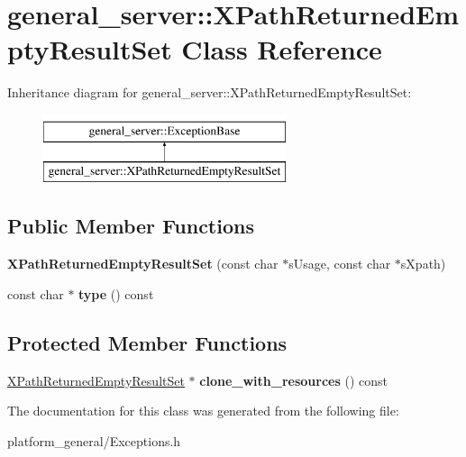 \hypertarget{classgeneral__server_1_1XPathReturnedEmptyResultSet}{\section{general\-\_\-server\-:\-:\-X\-Path\-Returned\-Empty\-Result\-Set \-Class \-Reference}
\label{classgeneral__server_1_1XPathReturnedEmptyResultSet}
}
\-Inheritance diagram for general\-\_\-server\-:\-:\-X\-Path\-Returned\-Empty\-Result\-Set\-:\begin{figure}[H]
\begin{center}
\leavevmode
\includegraphics[height=2.000000cm]{classgeneral__server_1_1XPathReturnedEmptyResultSet}
\end{center}
\end{figure}
\subsection*{\-Public \-Member \-Functions}
\begin{DoxyCompactItemize}
\item 
\hypertarget{classgeneral__server_1_1XPathReturnedEmptyResultSet_a0fec6a2e29fcc8a206277a105ef3dcba}{{\bfseries \-X\-Path\-Returned\-Empty\-Result\-Set} (const char $\ast$s\-Usage, const char $\ast$s\-Xpath)}\label{classgeneral__server_1_1XPathReturnedEmptyResultSet_a0fec6a2e29fcc8a206277a105ef3dcba}

\item 
\hypertarget{classgeneral__server_1_1XPathReturnedEmptyResultSet_a26dd561cb9e697a090a4b90341037b6d}{const char $\ast$ {\bfseries type} () const }\label{classgeneral__server_1_1XPathReturnedEmptyResultSet_a26dd561cb9e697a090a4b90341037b6d}

\end{DoxyCompactItemize}
\subsection*{\-Protected \-Member \-Functions}
\begin{DoxyCompactItemize}
\item 
\hypertarget{classgeneral__server_1_1XPathReturnedEmptyResultSet_ae1e2161c8c1cd761889b493fef1fd4f9}{\hyperlink{classgeneral__server_1_1XPathReturnedEmptyResultSet}{\-X\-Path\-Returned\-Empty\-Result\-Set} $\ast$ {\bfseries clone\-\_\-with\-\_\-resources} () const }\label{classgeneral__server_1_1XPathReturnedEmptyResultSet_ae1e2161c8c1cd761889b493fef1fd4f9}

\end{DoxyCompactItemize}


\-The documentation for this class was generated from the following file\-:\begin{DoxyCompactItemize}
\item 
platform\-\_\-general/\-Exceptions.\-h\end{DoxyCompactItemize}
